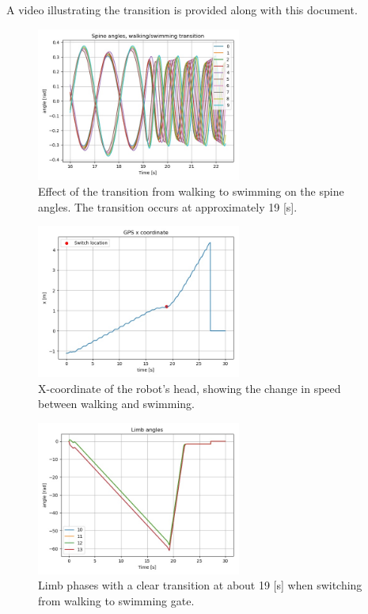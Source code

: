 \documentclass{cmc}
\begin{document}
A video illustrating the transition is provided along with this document. 

\begin{figure}
    \centering
    \includegraphics[width=0.6\textwidth]{figures/9g/spine_angles.jpg}
    \caption{Effect of the transition from walking to swimming on the spine angles. The transition occurs at approximately 19 [s].}
    \label{fig:9g_spine}
\end{figure}
\begin{figure}
    \centering
    \includegraphics[width=0.6\textwidth]{figures/9g/x_gps.jpg}
    \caption{X-coordinate of the robot's head, showing the change in speed between walking and swimming.}
    \label{fig:9g_x}
\end{figure}
\begin{figure}
    \centering
    \includegraphics[width=0.6\textwidth]{figures/9g/leg_angles.jpg}
    \caption{Limb phases with a clear transition at about 19 [s] when switching from walking to swimming gate.}
    \label{fig:9g_legs}
\end{figure}






\newpage


\label{sec:references}




\end{document}

